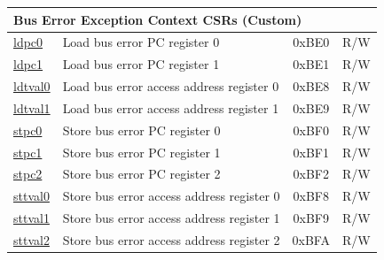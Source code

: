 \begin{longtable}{ | p{4.0cm} | p{8.4cm} | c | l | }
\multicolumn{4}{|l|}{\textbf{Bus Error Exception Context CSRs (Custom)}} \\\hline
\hyperref[regdesc:LDPC0]{ldpc0} & Load bus error PC register 0 & 0xBE0 & R/W \\\hline
\hyperref[regdesc:LDPC1]{ldpc1} & Load bus error PC register 1 & 0xBE1 & R/W \\\hline
\hyperref[regdesc:LDTVAL0]{ldtval0} & Load bus error access address register 0 & 0xBE8 & R/W \\\hline
\hyperref[regdesc:LDTVAL1]{ldtval1} & Load bus error access address register 1 & 0xBE9 & R/W \\\hline
\hyperref[regdesc:STPC0]{stpc0} & Store bus error PC register 0 & 0xBF0 & R/W \\\hline
\hyperref[regdesc:STPC1]{stpc1} & Store bus error PC register 1 & 0xBF1 & R/W \\\hline
\hyperref[regdesc:STPC2]{stpc2} & Store bus error PC register 2 & 0xBF2 & R/W \\\hline
\hyperref[regdesc:STTVAL0]{sttval0} & Store bus error access address register 0 & 0xBF8 & R/W \\\hline
\hyperref[regdesc:STTVAL1]{sttval1} & Store bus error access address register 1 & 0xBF9 & R/W \\\hline
\hyperref[regdesc:STTVAL2]{sttval2} & Store bus error access address register 2 & 0xBFA & R/W \\\hline

\end{longtable}
